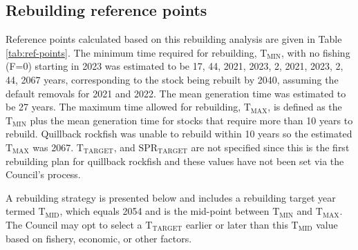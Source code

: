 \documentclass[11pt,
  english,
  a4paper,
]{article}
\begin{document}
\leavevmode\tagmcend\tagstructend


\hypertarget{rebuilding-reference-points}{%
\subsection{Rebuilding reference points}\label{rebuilding-reference-points}}

\leavevmode\tagmcend\tagstructend


Reference points calculated based on this rebuilding analysis are given in Table \ref{tab:ref-points}. The minimum time required for rebuilding, {\(\text{T}_\text{MIN}\)\leavevmode\tagmcend\tagstructend}, with no fishing (F=0) starting in 2023 was estimated to be 17, 44, 2021, 2023, 2, 2021, 2023, 2, 44, 2067 years, corresponding to the stock being rebuilt by 2040, assuming the default removals for 2021 and 2022. The mean generation time was estimated to be 27 years. The maximum time allowed for rebuilding, {\(\text{T}_\text{MAX}\)\leavevmode\tagmcend\tagstructend}, is defined as the {\(\text{T}_\text{MIN}\)\leavevmode\tagmcend\tagstructend} plus the mean generation time for stocks that require more than 10 years to rebuild. Quillback rockfish was unable to rebuild within 10 years so the estimated {\(\text{T}_\text{MAX}\)\leavevmode\tagmcend\tagstructend} was 2067. {\(\text{T}_\text{TARGET}\)\leavevmode\tagmcend\tagstructend}, and {\(\text{SPR}_\text{TARGET}\)\leavevmode\tagmcend\tagstructend} are not specified since this is the first rebuilding plan for quillback rockfish and these values have not been set via the Council's process.

\leavevmode\tagmcend\tagstructend\par


A rebuilding strategy is presented below and includes a rebuilding target year termed {\(\text{T}_\text{MID}\)\leavevmode\tagmcend\tagstructend}, which equals 2054 and is the mid-point between {\(\text{T}_\text{MIN}\)\leavevmode\tagmcend\tagstructend} and {\(\text{T}_\text{MAX}\)\leavevmode\tagmcend\tagstructend}. The Council may opt to select a {\(\text{T}_\text{TARGET}\)\leavevmode\tagmcend\tagstructend} earlier or later than this {\(\text{T}_\text{MID}\)\leavevmode\tagmcend\tagstructend} value based on fishery, economic, or other factors.
\end{document}

